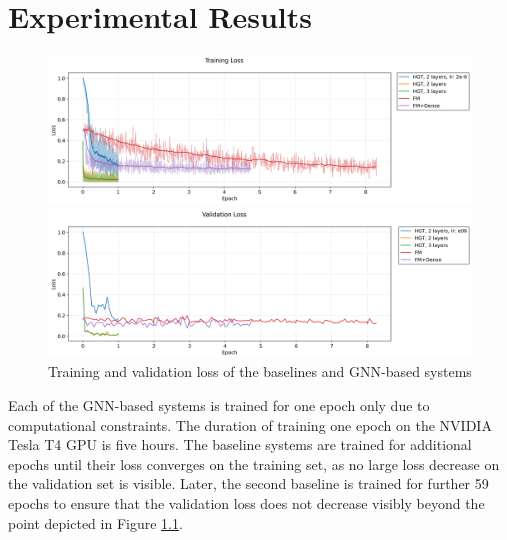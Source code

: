 \chapter{Experimental Results}
\label{ch:experimental}
\begin{figure}[h]
    \centering
    \begin{minipage}{0.9\textwidth}
        \includegraphics[width=\textwidth]{img/trainloss.png}
       
    \end{minipage}
    
    \begin{minipage}{0.9\textwidth}
        \includegraphics[width=\textwidth]{img/valloss.png}
       
    \end{minipage}
        \caption{Training and validation loss of the baselines and GNN-based systems}
     \label{fig:valloss}
\end{figure}

Each of the GNN-based systems is trained for one epoch only due to computational constraints. The duration of training one epoch on the NVIDIA Tesla T4 GPU is five hours. The baseline systems are trained for additional epochs until their loss converges on the training set, as no large loss decrease on the validation set is visible. Later, the second baseline is trained for further 59 epochs to ensure that the validation loss does not decrease visibly beyond the point depicted in Figure \ref{fig:valloss}. 


